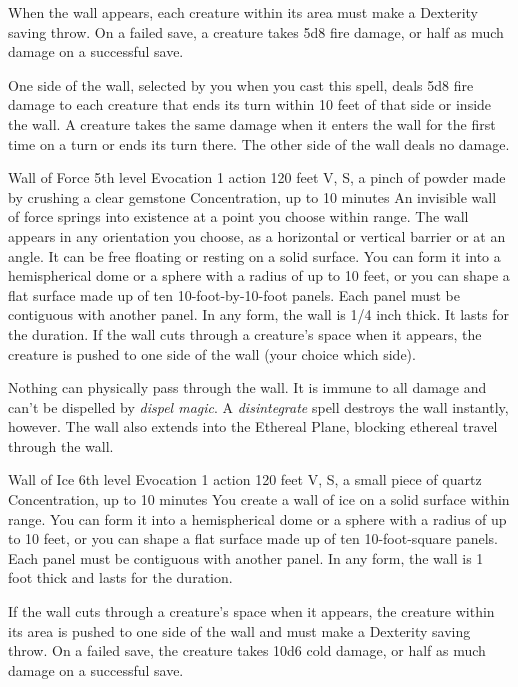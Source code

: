 \documentclass[10pt,a4paper,twoside,bg=print,twocolumn,openany,nodeprecatedcode]{dndbook}
\begin{document}
When the wall appears, each creature within its area must make a Dexterity saving throw. On a failed save, a creature takes 5d8 fire damage, or half as much damage on a successful save.

One side of the wall, selected by you when you cast this spell, deals 5d8 fire damage to each creature that ends its turn within 10 feet of that side or inside the wall. A creature takes the same damage when it enters the wall for the first time on a turn or ends its turn there. The other side of the wall deals no damage.



\DndSpellHeader%
{Wall of Force}
{5th level Evocation}
{1 action}
{120 feet}
{V, S, a pinch of powder made by crushing a clear gemstone}
{Concentration, up to 10 minutes}
An invisible wall of force springs into existence at a point you choose within range. The wall appears in any orientation you choose, as a horizontal or vertical barrier or at an angle. It can be free floating or resting on a solid surface. You can form it into a hemispherical dome or a sphere with a radius of up to 10 feet, or you can shape a flat surface made up of ten 10-foot-by-10-foot panels. Each panel must be contiguous with another panel. In any form, the wall is 1/4 inch thick. It lasts for the duration. If the wall cuts through a creature's space when it appears, the creature is pushed to one side of the wall (your choice which side).

Nothing can physically pass through the wall. It is immune to all damage and can't be dispelled by \textit{dispel magic}. A \textit{disintegrate} spell destroys the wall instantly, however. The wall also extends into the Ethereal Plane, blocking ethereal travel through the wall.



\DndSpellHeader%
{Wall of Ice}
{6th level Evocation}
{1 action}
{120 feet}
{V, S, a small piece of quartz}
{Concentration, up to 10 minutes}
You create a wall of ice on a solid surface within range. You can form it into a hemispherical dome or a sphere with a radius of up to 10 feet, or you can shape a flat surface made up of ten 10-foot-square panels. Each panel must be contiguous with another panel. In any form, the wall is 1 foot thick and lasts for the duration.

If the wall cuts through a creature's space when it appears, the creature within its area is pushed to one side of the wall and must make a Dexterity saving throw. On a failed save, the creature takes 10d6 cold damage, or half as much damage on a successful save.
\end{document}
